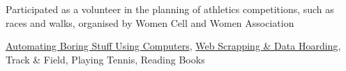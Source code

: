 \vspace{3mm}
\begin{cvitems}
  \item Participated as a volunteer in the planning of athletics competitions, such as races and walks, organised by Women Cell and Women Association
  \item \href{https://github.com/sunil-dhaka/automate-stuff-with-python}{Automating Boring Stuff Using Computers}, \href{https://github.com/sunil-dhaka/python-webScrappers}{Web Scrapping \& Data Hoarding}, Track \& Field, Playing Tennis, Reading Books
\end{cvitems}

